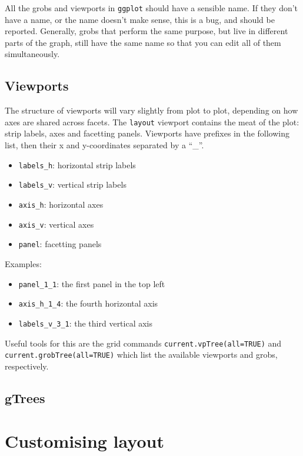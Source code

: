 All the grobs and viewports in {\tt ggplot} should have a sensible name.  If they don't have a name, or the name doesn't make sense, this is a bug, and should be reported.  Generally, grobs that perform the same purpose, but live in different parts of the graph, still have the same name so that you can edit all of them simultaneously.  

\subsection{Viewports}\label{sub:viewports}

The structure of viewports will vary slightly from plot to plot, depending on how axes are shared across facets.  The {\tt layout} viewport contains the meat of the plot: strip labels, axes and facetting panels.  Viewports have prefixes in the following list, then their x and y-coordinates separated by a ``\_''.

\begin{itemize}
  \item {\tt labels\_h}: horizontal strip labels
  \item {\tt labels\_v}: vertical strip labels
  \item {\tt axis\_h}: horizontal axes
  \item {\tt axis\_v}: vertical axes
  \item {\tt panel}: facetting panels
\end{itemize}

Examples:

\begin{itemize}
  \item {\tt panel\_1\_1}: the first panel in the top left
  \item {\tt axis\_h\_1\_4}: the fourth horizontal axis
  \item {\tt labels\_v\_3\_1}: the third vertical axis
\end{itemize}

Useful tools for this are the grid commands {\tt current.vpTree(all=TRUE)} and {\tt current.grobTree(all=TRUE)} which list the available viewports and grobs, respectively.  

\subsection{gTrees}\label{sub:gtrees}

\section{Customising layout}\label{sec:controlling_output}

